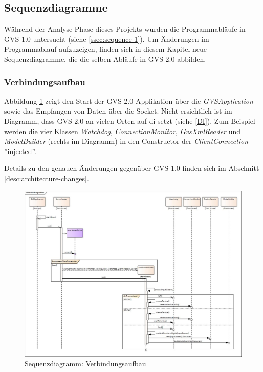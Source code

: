 \documentclass[11pt,a4paper,english,oneside]{book}
\numberwithin{equation}{chapter}
\begin{document}
	
	\subsection{Sequenzdiagramme}
	Während der Analyse-Phase dieses Projekts wurden die Programmabläufe in GVS 1.0 untersucht (siehe \ref{ssec:sequence-1}). Um Änderungen im Programmablauf aufzuzeigen, finden sich in diesem Kapitel neue Sequenzdiagramme, die die selben Abläufe in GVS 2.0 abbilden. 
	
	\subsubsection{Verbindungsaufbau}
	Abbildung \ref{fig:sd-verbindungsaufbau-2} zeigt den Start der GVS 2.0 Applikation über die \textit{GVSApplication} sowie das Empfangen von Daten über die Socket. Nicht ersichtlich ist im Diagramm, dass GVS 2.0 an vielen Orten auf \gls{di} setzt (siehe \ref{DI}). Zum Beispiel werden die vier Klassen \textit{Watchdog},  \textit{ConnectionMonitor},  \textit{GvsXmlReader} und  \textit{ModelBuilder} (rechts im Diagramm) in den Constructor der  \textit{ClientConnection} ''injected''.
	
	Details zu den genauen Änderungen gegenüber GVS 1.0 finden sich im Abschnitt \ref{desc:architecture-changes}.

	\begin{figure}[h!]
		\centering
		\includegraphics[width=\linewidth]{assets/images/sequence_Verbindungsaufbau}
		\caption{Sequenzdiagramm: Verbindungsaufbau}
		\label{fig:sd-verbindungsaufbau-2}
	\end{figure}
	
\end{document}
